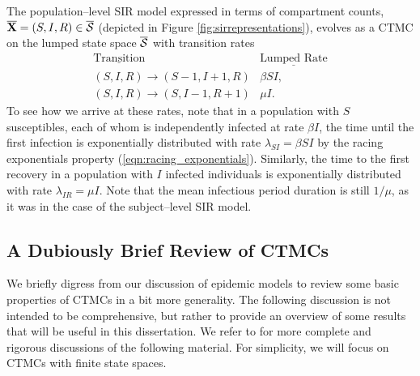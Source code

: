 The population--level SIR model expressed in terms of compartment counts, $ \overline{\mathbf{X}} = (S, I, R) \in \overline{\mathcal{S}} $ (depicted in Figure \ref{fig:sirrepresentations}), evolves as a CTMC on the lumped state space $ \overline{\mathcal{S}} $ with transition rates
\begin{equation*}
\begin{array}{cc}
\underline{\text{Transition}} & \underline{\text{Lumped Rate}} \\
(S,I,R) \longrightarrow (S-1,I+1,R) & \beta S I ,\\
(S,I,R) \longrightarrow (S,I-1,R+1) & \mu I .
\end{array}
\end{equation*}
To see how we arrive at these rates, note that in a population with $ S $ susceptibles, each of whom is independently infected at rate $ \beta I $, the time until the first infection is exponentially distributed with rate $ \lambda_{SI} = \beta SI $ by the racing exponentials property (\ref{eqn:racing_exponentials}). Similarly, the time to the first recovery in a population with $ I $ infected individuals is exponentially distributed with rate $\lambda_{IR} = \mu I $. Note that the mean infectious period duration is still $ 1/\mu $, as it was in the case of the subject--level SIR model. 

\subsection{A Dubiously Brief Review of CTMCs}
\label{subsec:ctmc_overview}

We briefly digress from our discussion of epidemic models to review some basic properties of CTMCs in a bit more generality. The following discussion is not intended to be comprehensive, but rather to provide an overview of some results that will be useful in this dissertation. We refer to \cite{bremaud1999markov,fuchs2013inference,guttorp1995stochastic,wilkinson2011stochastic} for more complete and rigorous discussions of the following material. For simplicity, we will focus on CTMCs with finite state spaces. 

